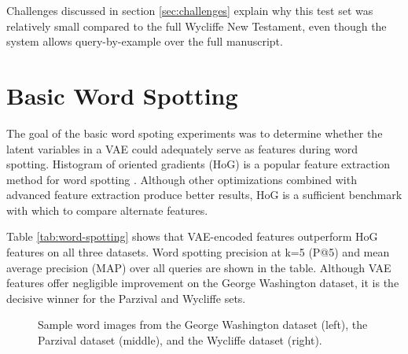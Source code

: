 \documentclass[final]{ukthesis}
\begin{document}
Challenges discussed in section \ref{sec:challenges} explain why this test set was relatively small compared to the full Wycliffe New Testament, even though the system allows query-by-example over the full manuscript.


%
%
\section{Basic Word Spotting}
\label{sec:basic-results}
The goal of the basic word spoting experiments was to determine whether the latent variables in a VAE could adequately serve as features during word spotting. Histogram of oriented gradients (HoG) is a popular feature extraction method for word spotting \cite{giotis2017survey}. Although other optimizations combined with advanced feature extraction produce better results, HoG is a sufficient benchmark with which to compare alternate features.

Table \ref{tab:word-spotting} shows that VAE-encoded features outperform HoG features on all three datasets. Word spotting precision at k=5 (P@5) and mean average precision (MAP) over all queries are shown in the table. Although VAE features offer negligible improvement on the George Washington dataset, it is the decisive winner for the Parzival and Wycliffe sets.

\begin{figure}[t]
\begin{center}
\end{center}
\caption{Sample word images from the George Washington dataset (left), the Parzival dataset (middle), and the Wycliffe dataset (right).}
\label{fig:word-samples}
\end{figure}
\end{document}
